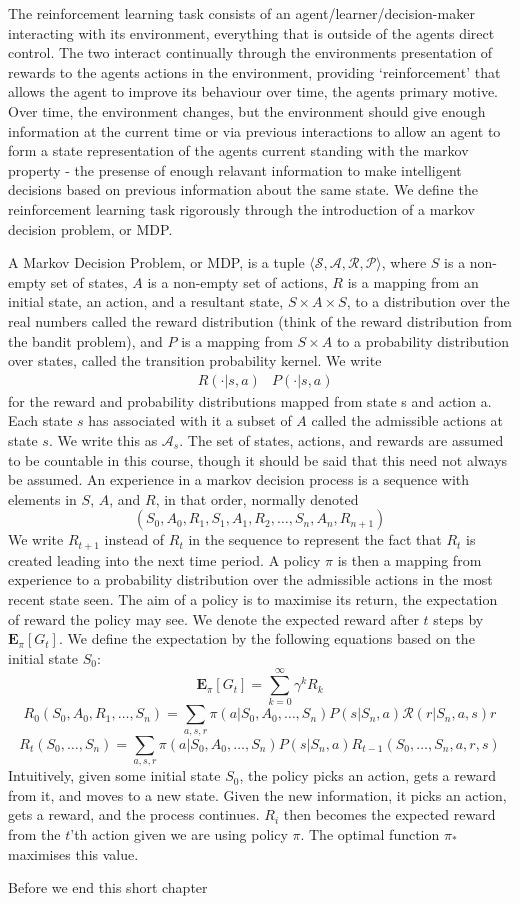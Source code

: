 The reinforcement learning task consists of an agent/learner/decision-maker interacting with its environment, everything that is outside of the agents direct control. The two interact continually through the environments presentation of rewards to the agents actions in the environment, providing `reinforcement' that allows the agent to improve its behaviour over time, the agents primary motive. Over time, the environment changes, but the environment should give enough information at the current time or via previous interactions to allow an agent to form a state representation of the agents current standing with the markov property - the presense of enough relavant information to make intelligent decisions based on previous information about the same state. We define the reinforcement learning task rigorously through the introduction of a markov decision problem, or MDP.

A Markov Decision Problem, or MDP, is a tuple $\langle \mathcal{S}, \mathcal{A}, \mathcal{R}, \mathcal{P} \rangle$, where $S$ is a non-empty set of states, $A$ is a non-empty set of actions, $R$ is a mapping from an initial state, an action, and a resultant state, $S \times A \times S$, to a distribution over the real numbers called the reward distribution (think of the reward distribution from the bandit problem), and $P$ is a mapping from $S \times A$ to a probability distribution over states, called the transition probability kernel. We write
%
\begin{align*} &R(\cdotp | s, a) &P(\cdotp | s,a) \end{align*}
%
for the reward and probability distributions mapped from state s and action a. Each state $s$ has associated with it a subset of $A$ called the admissible actions at state $s$. We write this as $\mathcal{A}_s$. The set of states, actions, and rewards are assumed to be countable in this course, though it should be said that this need not always be assumed. An experience in a markov decision process is a sequence with elements in $S$, $A$, and $R$, in that order, normally denoted
%
\[ (S_0, A_0, R_1, S_1, A_1, R_2, \dots, S_n, A_n, R_{n+1}) \]
%
We write $R_{t+1}$ instead of $R_t$ in the sequence to represent the fact that $R_t$ is created leading into the next time period. A policy $\pi$ is then a mapping from experience to a probability distribution over the admissible actions in the most recent state seen. The aim of a policy is to maximise its return, the expectation of reward the policy may see. We denote the expected reward after $t$ steps by $\mathbf{E}_\pi[G_t]$. We define the expectation by the following equations based on the initial state $S_0$:
%
\[ \mathbf{E}_\pi[G_t] = \sum_{k = 0}^{\infty} \gamma^k R_k \]
%
\[ R_0(S_0,A_0,R_1,\dots,S_n) = \sum_{a,s,r}\pi(a|S_0,A_0,\dots,S_n) P(s|S_n,a) \mathcal{R}(r|S_n,a,s)r \]
%
\[ R_t(S_0, \dots, S_n) = \sum_{a,s,r}\pi(a|S_0,A_0,\dots,S_n) P(s|S_n,a) R_{t-1}(S_0, \dots, S_n, a, r, s) \]
%
Intuitively, given some initial state $S_0$, the policy picks an action, gets a reward from it, and moves to a new state. Given the new information, it picks an action, gets a reward, and the process continues. $R_i$ then becomes the expected reward from the $t$'th action given we are using policy $\pi$. The optimal function $\pi_*$ maximises this value.

Before we end this short chapter

